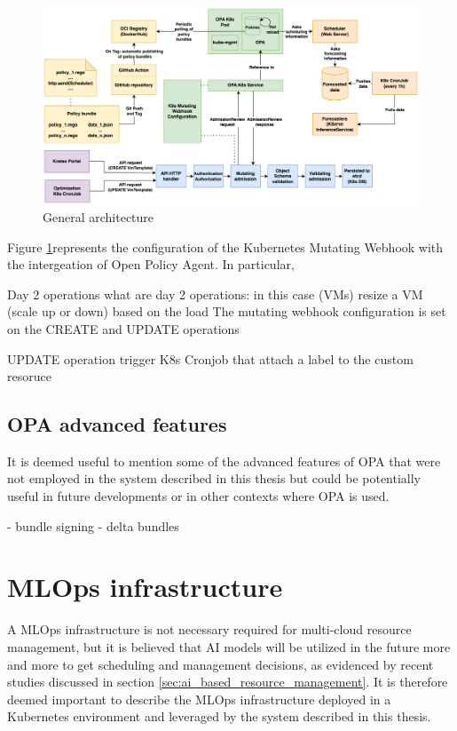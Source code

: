 \begin{figure}[htb]
\centering
\includegraphics[width=1\linewidth]{images/architecture.png}
\caption{General architecture}
\label{fig:architecture}
\end{figure}

Figure \ref{fig:architecture}represents the configuration of the Kubernetes Mutating Webhook with the intergeation of Open Policy Agent.
In particular, 




Day 2 operations
what are day 2 operations: in this case (VMs) resize a VM (scale up or down) based on the load
The mutating webhook configuration is set on the CREATE and UPDATE operations

UPDATE operation trigger
K8s Cronjob that attach a label to the custom resoruce 

\subsection{OPA advanced features}

It is deemed useful to mention some of the advanced features of OPA that were not employed in the system described in this thesis but could be potentially useful in future developments or in other contexts where OPA is used.

- bundle signing
- delta bundles

\newpage

\section{MLOps infrastructure}

A MLOps infrastructure is not necessary required for multi-cloud resource management, but it is believed that AI models will be utilized in the future more and more to get scheduling and management decisions, as evidenced by recent studies discussed in section \ref{sec:ai_based_resource_management}.
It is therefore deemed important to describe the MLOps infrastructure deployed in a Kubernetes environment and leveraged by the system described in this thesis.

